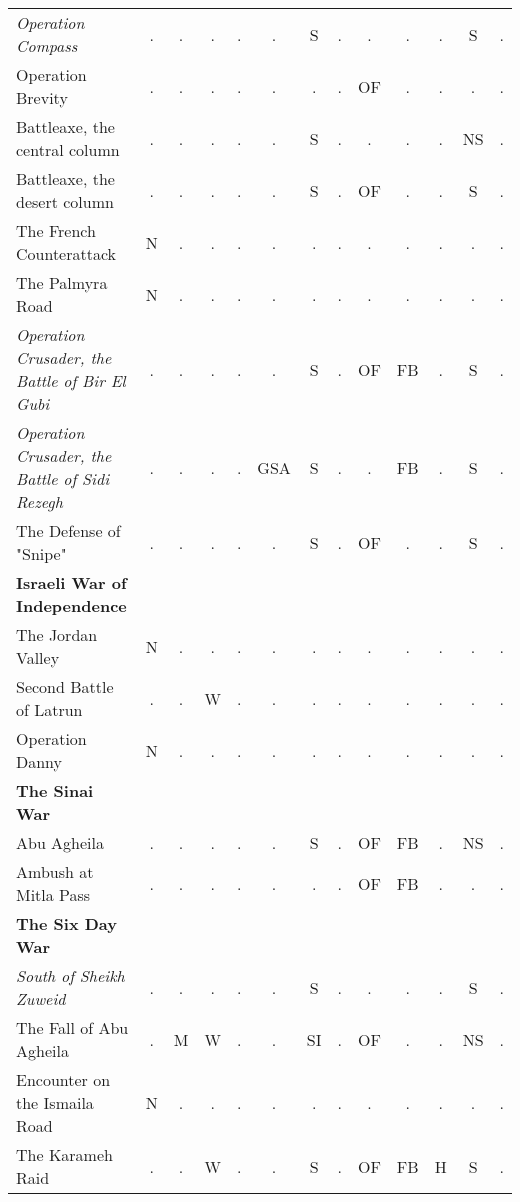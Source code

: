 \documentclass[a4paper]{article}
\newenvironment{texte}{\rmfamily\footnotesize}{}
\begin{document}
\begin{texte}
\begin{tabular}{lcccccccccccc}
\it  Operation Compass                             & . &  . &  . & .  &  .  & S  & . &  . &  . & . &  S & . \\
     Operation Brevity                             & . &  . &  . & .  &  .  & .  & . & OF &  . & . &  . & . \\
     Battleaxe, the central column                 & . &  . &  . & .  &  .  & S  & . &  . &  . & . & NS & . \\
     Battleaxe, the desert column                  & . &  . &  . & .  &  .  & S  & . & OF &  . & . &  S & . \\
     The French Counterattack                      & N &  . &  . & .  &  .  & .  & . &  . &  . & . &  . & . \\
     The Palmyra Road                              & N &  . &  . & .  &  .  & .  & . &  . &  . & . &  . & . \\
\it  Operation Crusader, the Battle of Bir El Gubi & . &  . &  . & .  &  .  & S  & . & OF & FB & . &  S & . \\
\it  Operation Crusader, the Battle of Sidi Rezegh & . &  . &  . & .  & GSA & S  & . &  . & FB & . &  S & . \\
     The Defense of "Snipe"                        & . &  . &  . & .  &  .  & S  & . & OF &  . & . &  S & . \\

\bf Israeli War of Independence \\

     The Jordan Valley                             & N &  . &  . &  . &  .  &  . & . &  . &  . & . &  . & . \\
     Second Battle of Latrun                       & . &  . &  W &  . &  .  &  . & . &  . &  . & . &  . & . \\
     Operation Danny                               & N &  . &  . &  . &  .  &  . & . &  . &  . & . &  . & . \\

\bf The Sinai War \\

     Abu Agheila                                   & . &  . &  . &  . &  .  & S  & . & OF & FB & . & NS & . \\
     Ambush at Mitla Pass                          & . &  . &  . &  . &  .  &  . & . & OF & FB & . &  . & . \\

\bf The Six Day War \\

\it  South of Sheikh Zuweid                        & . &  . &  . &  . &  .  & S  & . &  . &  . & . &  S & . \\
     The Fall of Abu Agheila                       & . &  M &  W &  . &  .  & SI & . & OF &  . & . & NS & . \\
     Encounter on the Ismaila Road                 & N &  . &  . &  . &  .  &  . & . &  . &  . & . &  . & . \\
     The Karameh Raid                              & . &  . &  W &  . &  .  & S  & . & OF & FB & H &  S & . \\


\end{tabular}
\end{texte}
\end{document}

